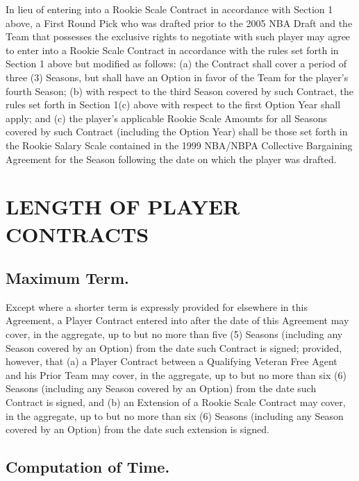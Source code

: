 \documentclass[
]{book}
\begin{document}
In lieu of entering into a Rookie Scale Contract in accordance with Section 1 above, a First Round Pick who was drafted prior to the 2005 NBA Draft and the Team that possesses the exclusive rights to negotiate with such player may agree to enter into a Rookie Scale Contract in accordance with the rules set forth in Section 1 above but modified as follows: (a) the Contract shall cover a period of three (3) Seasons, but shall have an Option in favor of the Team for the player's fourth Season; (b) with respect to the third Season covered by such Contract, the rules set forth in Section 1(c) above with respect to the first Option Year shall apply; and (c) the player's applicable Rookie Scale Amounts for all Seasons covered by such Contract (including the Option Year) shall be those set forth in the Rookie Salary Scale contained in the 1999 NBA/NBPA Collective Bargaining Agreement for the Season following the date on which the player was drafted.

\hypertarget{length-of-player-contracts}{%
\chapter{LENGTH OF PLAYER CONTRACTS}\label{length-of-player-contracts}}

\hypertarget{maximum-term.}{%
\section{Maximum Term.}\label{maximum-term.}}

Except where a shorter term is expressly provided for elsewhere in this Agreement, a Player Contract entered into after the date of this Agreement may cover, in the aggregate, up to but no more than five (5) Seasons (including any Season covered by an Option) from the date such Contract is signed; provided, however, that (a) a Player Contract between a Qualifying Veteran Free Agent and his Prior Team may cover, in the aggregate, up to but no more than six (6) Seasons (including any Season covered by an Option) from the date such Contract is signed, and (b) an Extension of a Rookie Scale Contract may cover, in the aggregate, up to but no more than six (6) Seasons (including any Season covered by an Option) from the date such extension is signed.

\hypertarget{computation-of-time.}{%
\section{Computation of Time.}\label{computation-of-time.}}
\end{document}
